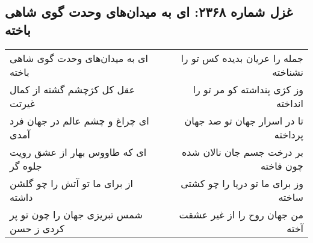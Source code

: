 \begin{center}
\section*{غزل شماره ۲۳۶۸: ای به میدان‌های وحدت گوی شاهی باخته}
\label{sec:2368}
\begin{longtable}{l p{0.5cm} r}
ای به میدان‌های وحدت گوی شاهی باخته
&&
جمله را عریان بدیده کس تو را نشناخته
\\
عقل کل کژچشم گشته از کمال غیرتت
&&
وز کژی پنداشته کو مر تو را انداخته
\\
ای چراغ و چشم عالم در جهان فرد آمدی
&&
تا در اسرار جهان تو صد جهان پرداخته
\\
ای که طاووس بهار از عشق رویت جلوه گر
&&
بر درخت جسم جان نالان شده چون فاخته
\\
از برای ما تو آتش را چو گلشن داشته
&&
وز برای ما تو دریا را چو کشتی ساخته
\\
شمس تبریزی جهان را چون تو پر کردی ز حسن
&&
من جهان روح را از غیر عشقت آخته
\\
\end{longtable}
\end{center}
